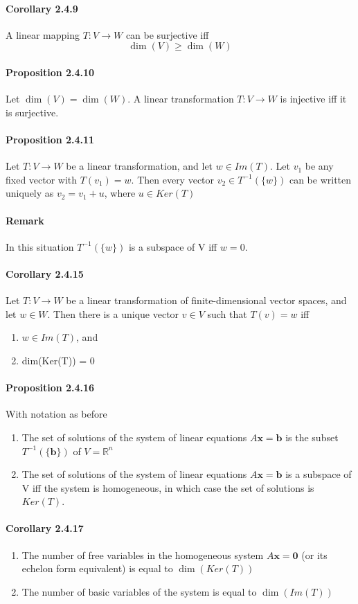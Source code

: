 \documentclass[11pt]{article}
\newcommand{\tb}[1]{\textbf{#1}}
\newcommand{\litran}[0]{$T: V \rightarrow W$ }
\newcommand{\real}[0]{\mathbb{R}}
\begin{document}
{\paragraph{Corollary 2.4.9} A linear mapping \litran can be surjective iff $$\dim(V) \geq \dim(W)$$
\paragraph{Proposition 2.4.10} Let $\dim(V) = \dim(W)$. A linear transformation \litran is injective iff it is surjective.
\paragraph{Proposition 2.4.11} Let \litran be a linear transformation, and let $w \in Im(T)$. Let $v_1$ be any fixed vector with $T(v_1) = w$. Then every vector $v_2 \in T^{-1}(\{w\})$ can be written uniquely as $v_2 = v_1 + u$, where $u \in Ker(T)$
\paragraph{Remark} In this situation $T^{-1}(\{w\})$ is a subspace of V iff $w = 0$.
\paragraph{Corollary 2.4.15} Let \litran be a linear transformation of finite-dimensional vector spaces, and let $w \in W$. Then there is a unique vector $v \in V$ such that $T(v) = w$ iff
\begin{enumerate}
	\item $w \in Im(T)$, and
	\item dim(Ker(T)) = 0
\end{enumerate}
\paragraph{Proposition 2.4.16} With notation as before
\begin{enumerate}
	\item The set of solutions of the system of linear equations $A\tb{x} = \tb{b}$ is the subset $T^{-1}(\{\tb{b}\})$ of $V = \real^n$
	\item The set of solutions of the system of linear equations $A\tb{x} = \tb{b}$ is a subspace of V iff the system is homogeneous, in which case the set of solutions is $Ker(T)$.
\end{enumerate}
\paragraph{Corollary 2.4.17}
\begin{enumerate}
	\item The number of free variables in the homogeneous system $A\tb{x} = \tb{0}$ (or its echelon form equivalent) is equal to $\dim(Ker(T))$
	\item The number of basic variables of the system is equal to $\dim(Im(T))$
\end{enumerate}
}
\end{document}
